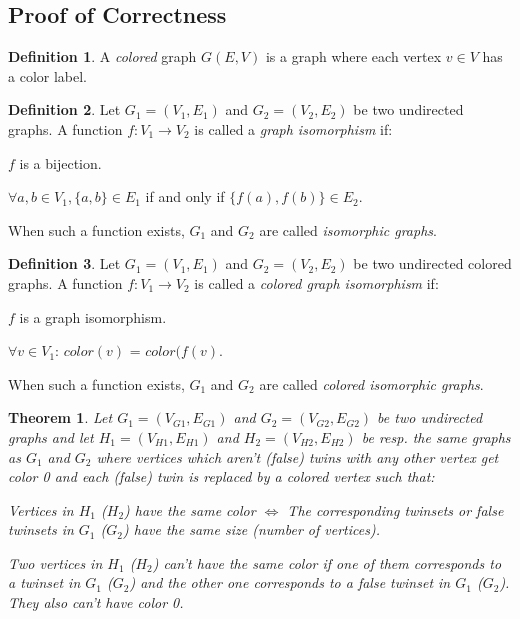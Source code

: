 \documentclass[twoside]{article}
\theoremstyle{definition}
\newtheorem{definition}{Definition}
\theoremstyle{plain}
\newtheorem{theorem}{Theorem}
\begin{document}
\begin{multicols}{2}
\section{Proof of Correctness}
\begin{definition}
A \emph{colored} graph $G(E,V)$ is a graph where each vertex $v \in V$ has a color label.
\end{definition}
\begin{definition}\label{def:iso}
Let $G_1 = (V_1, E_1)$ and $G_2 = (V_2, E_2)$ be two undirected graphs. A function $f: V_1 \to V_2$ is called a \emph{graph isomorphism} if:
\begin{compactenum}[\upshape(a)]
\item $f$ is a bijection. \label{voorwaarde1}
\item $\forall a, b \in V_1, \{a, b\} \in E_1$ if and only if $\{f(a), f(b)\} \in E_2$.\label{voorwaarde2}
\end{compactenum}
When such a function exists, $G_1$ and $G_2$ are called \emph{isomorphic graphs}. 
\end{definition}
\begin{definition}\label{def:coloriso}
Let $G_1 = (V_1, E_1)$ and $G_2 = (V_2, E_2)$ be two undirected colored graphs. A function $f: V_1 \to V_2$ is called a \emph{colored graph isomorphism} if: 
\begin{compactenum}[\upshape(a)]
\item $f$ is a graph isomorphism.\label{voorwaarde4}
\item $\forall v \in V_1$: $color(v)$ = $color (f(v)$. \label{voorwaarde3}
\end{compactenum}
When such a function exists, $G_1$ and $G_2$ are called \emph{colored isomorphic graphs}. 
\end{definition}
\begin{theorem}
Let $G_1 = (V_{G1}, E_{G1})$ and $G_2 = (V_{G2}, E_{G2})$ be two undirected  graphs and let $H_1 = (V_{H1}, E_{H1})$ and $H_2 = (V_{H2}, E_{H2})$ be resp. the same graphs as $G_1$ and $G_2$ where vertices which aren't (false) twins with any other vertex get color 0 and each (false) twin is replaced by a colored vertex such that: \begin{compactenum}[\upshape(a)]
\item Vertices in $H_1$ ($H_2$) have the same color $\iff$ The corresponding twinsets or false twinsets in $G_1$ ($G_2$) have the same size (number of vertices).
\item Two vertices in $H_1$ ($H_2$) can't have the same color if one of them corresponds to a twinset in $G_1$ ($G_2$) and the other one corresponds to a false twinset in $G_1$ ($G_2$). They also can't have color 0.

\end{compactenum}
\end{theorem}
\end{multicols}
\end{document}
